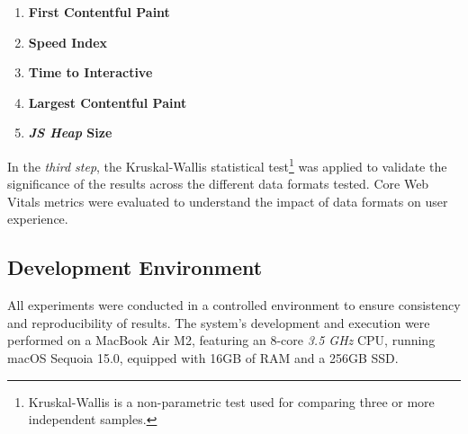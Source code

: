 \begin{enumerate}
    \item \textbf{First Contentful Paint}%
    \item \textbf{Speed Index}%
    \item \textbf{Time to Interactive}%
    \item \textbf{Largest Contentful Paint}%
    \item \textbf{\textit{JS Heap} Size}%
\end{enumerate}

In the \textit{third step}, the Kruskal-Wallis statistical test\footnote{Kruskal-Wallis is a non-parametric test used for comparing three or more independent samples.} was applied to validate the significance of the results across the different data formats tested. Core Web Vitals metrics were evaluated to understand the impact of data formats on user experience.



\subsection{Development Environment}

All experiments were conducted in a controlled environment to ensure consistency and reproducibility of results. The system's development and execution were performed on a MacBook Air M2, featuring an 8-core \textit{3.5 GHz} CPU, running macOS Sequoia 15.0, equipped with 16GB of RAM and a 256GB SSD.

